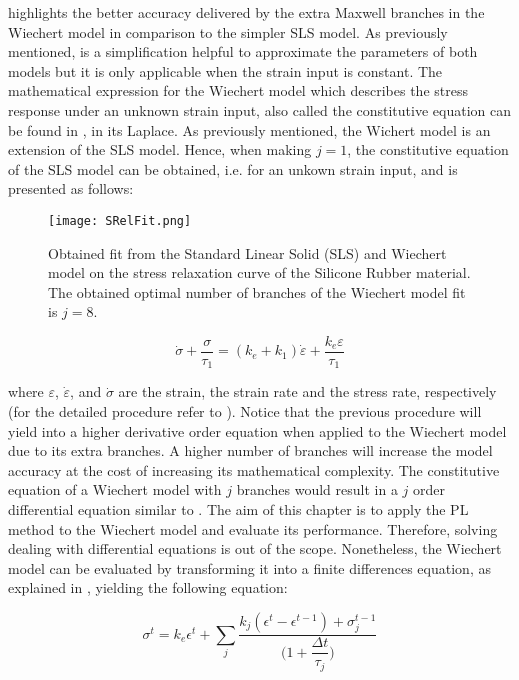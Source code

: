  highlights the better accuracy delivered by the extra Maxwell branches in the Wiechert model in comparison to the simpler SLS model. As previously mentioned,  is a simplification helpful to approximate the parameters of both models but it is only applicable when the strain input is constant. The mathematical expression for the Wiechert model which describes the stress response under an unknown strain input, also called the constitutive equation can be found in \cite{roylance2001engineering}, in its Laplace. 
As previously mentioned, the Wichert model is an extension of the SLS model. Hence, when making $j=1$, the constitutive equation of the SLS model can be obtained, i.e. for an unkown strain input, and is presented as follows:

\begin{figure}[htb!]
	\centering
    \texttt{[image: SRelFit.png]}
    \caption{Obtained fit from the Standard Linear Solid (SLS) and Wiechert model on the stress relaxation curve of the Silicone Rubber material. The obtained optimal number of branches of the Wiechert model fit is $j=8$.}
    \label{fig:StressRelFit}
\end{figure}

\begin{equation}
\label{eq3}
\dot{\sigma} + \frac{\sigma}{\tau_1} =  (k_e + k_1)\dot{\varepsilon} + \frac{k_e\varepsilon}{\tau_1}
\end{equation}

\noindent where $\varepsilon$, $\dot{\varepsilon}$, and $\dot{\sigma}$ are the strain, the strain rate and the stress rate, respectively (for the detailed procedure refer to \cite{roylance2001engineering}). Notice that the previous procedure will yield into a higher derivative order equation when applied to the Wiechert model due to its extra branches. A higher number of branches will increase the model accuracy at the cost of increasing its mathematical complexity. The constitutive equation of a Wiechert model with $j$ branches would result in a $j$ order differential equation similar to . The aim of this chapter is to apply the PL method to the Wiechert model and evaluate its performance. Therefore, solving dealing with differential equations is out of the scope. Nonetheless, the Wiechert model can be evaluated by transforming it into a finite differences equation, as explained in \cite{roylance2001engineering}, yielding the following equation:

\begin{equation}
    \label{eq4}
    \sigma^t = k_e\epsilon^t + \sum_j \frac{k_j(\epsilon^t - \epsilon^{t-1}) + \sigma_j^{t-1}}{\bigg(1+\dfrac{\Delta t}{\tau_j}\bigg)}
\end{equation}

